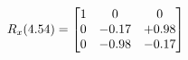 \documentclass[preview]{standalone}
\begin{document}
\begin{align*}
\special{dvisvgm:raw <g id='unique000'>}R_{x}(4.54) = \begin{bmatrix}1 & 0 & 0 \\0 & -0.17 & +0.98 \\0 & -0.98 & -0.17\end{bmatrix}\special{dvisvgm:raw </g>}
\end{align*}
\end{document}
